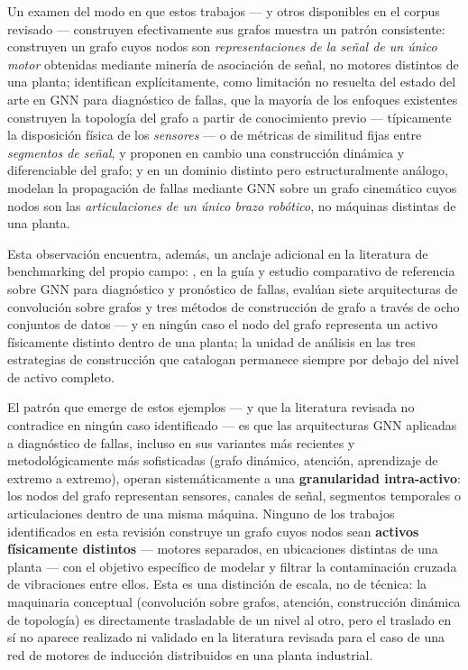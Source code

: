 \documentclass[11pt]{article}
\begin{document}
Un examen del modo en que estos trabajos --- y otros disponibles en el corpus revisado --- construyen efectivamente sus grafos muestra un patrón consistente: \citet{zhang2026gcn} construyen un grafo cuyos nodos son \textit{representaciones de la señal de un único motor} obtenidas mediante minería de asociación de señal, no motores distintos de una planta; \citet{xiao2026cdgcn} identifican explícitamente, como limitación no resuelta del estado del arte en GNN para diagnóstico de fallas, que la mayoría de los enfoques existentes construyen la topología del grafo a partir de conocimiento previo --- típicamente la disposición física de los \textit{sensores} --- o de métricas de similitud fijas entre \textit{segmentos de señal}, y proponen en cambio una construcción dinámica y diferenciable del grafo; y en un dominio distinto pero estructuralmente análogo, \citet{periasamy2026} modelan la propagación de fallas mediante GNN sobre un grafo cinemático cuyos nodos son las \textit{articulaciones de un único brazo robótico}, no máquinas distintas de una planta.

Esta observación encuentra, además, un anclaje adicional en la literatura de benchmarking del propio campo: \citet{li2022gnnbenchmark}, en la guía y estudio comparativo de referencia sobre GNN para diagnóstico y pronóstico de fallas, evalúan siete arquitecturas de convolución sobre grafos y tres métodos de construcción de grafo a través de ocho conjuntos de datos --- y en ningún caso el nodo del grafo representa un activo físicamente distinto dentro de una planta; la unidad de análisis en las tres estrategias de construcción que catalogan permanece siempre por debajo del nivel de activo completo.

El patrón que emerge de estos ejemplos --- y que la literatura revisada no contradice en ningún caso identificado --- es que las arquitecturas GNN aplicadas a diagnóstico de fallas, incluso en sus variantes más recientes y metodológicamente más sofisticadas (grafo dinámico, atención, aprendizaje de extremo a extremo), operan sistemáticamente a una \textbf{granularidad intra-activo}: los nodos del grafo representan sensores, canales de señal, segmentos temporales o articulaciones dentro de una misma máquina. Ninguno de los trabajos identificados en esta revisión construye un grafo cuyos nodos sean \textbf{activos físicamente distintos} --- motores separados, en ubicaciones distintas de una planta --- con el objetivo específico de modelar y filtrar la contaminación cruzada de vibraciones entre ellos. Esta es una distinción de escala, no de técnica: la maquinaria conceptual (convolución sobre grafos, atención, construcción dinámica de topología) es directamente trasladable de un nivel al otro, pero el traslado en sí no aparece realizado ni validado en la literatura revisada para el caso de una red de motores de inducción distribuidos en una planta industrial.
\end{document}
